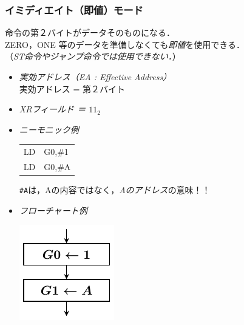 \documentclass{beamer}                 %
\begin{document}
\begin{frame}
  \frametitle{イミディエイト（即値）モード}
  命令の第２バイトがデータそのものになる．\\
  ZERO，ONE 等のデータを準備しなくても\emph{即値}を使用できる．\\
  （\emph{ST命令やジャンプ命令では使用できない．}）\\
  \vfill
  \begin{itemize}
  \item \emph{実効アドレス（EA : Effective Address）} \\
    実効アドレス = 第２バイト \\
    \vfill
  \item \emph{XRフィールド ＝ $11_2$}
    \vfill
  \item \emph{ニーモニック例} \\
    {\ttfamily\vspace{-0.5cm}\begin{center}
      \begin{tabular}{l l}
        LD & G0,\#1 \\
        LD & G0,\#A \\
      \end{tabular}
    \end{center}}
    \texttt{\#A}は，Aの内容ではなく，\emph{Aのアドレス}の意味！！
    \vfill
  \item \emph{フローチャート例} \\
    \vspace{-0.5cm}\centerline{\includegraphics[scale=0.8]{../Tikz/flowG.pdf}}
  \end{itemize}
  \vfill
  \vfill
\end{frame}
\end{document}
